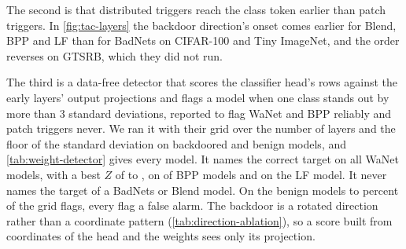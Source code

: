 \FloatBarrier

The second is that distributed triggers reach the class token earlier than patch triggers. In \cref{fig:tac-layers} the backdoor direction's onset comes earlier for Blend, BPP and LF than for BadNets on CIFAR-100 and Tiny ImageNet, and the order reverses on GTSRB, which they did not run.

The third is a data-free detector that scores the classifier head's rows against the early layers' output projections and flags a model when one class stands out by more than 3 standard deviations, reported to flag WaNet and BPP reliably and patch triggers never. We ran it with their grid over the number of layers and the floor of the standard deviation on \WeightDetectorBackdoored{} backdoored and \WeightDetectorBenign{} benign models, and \cref{tab:weight-detector} gives every model. It names the correct target on all \WeightDetectorWanetModels{} WaNet models, with a best $Z$ of \WeightDetectorWanetBestZMin{} to \WeightDetectorWanetBestZMax{}, on \WeightDetectorBppNamed{} of \WeightDetectorBppModels{} BPP models and on the \WeightDetectorLfModels{} LF model. It never names the target of a BadNets or Blend model. On the benign models \WeightDetectorBenignFlagMin{} to \WeightDetectorBenignFlagMax{} percent of the grid flags, every flag a false alarm. The backdoor is a rotated direction rather than a coordinate pattern (\cref{tab:direction-ablation}), so a score built from coordinates of the head and the weights sees only its projection.


\FloatBarrier
